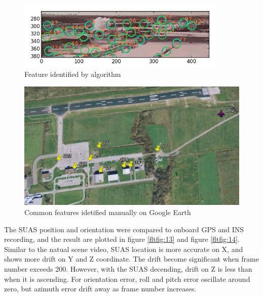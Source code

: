 \begin{figure}[h]
\centering
\includegraphics[width=10cm, keepaspectratio=true]
{./Figures/fltfig/airport/frame398_features.jpg}
\caption{Feature identified by algorithm }
\label{fltfig:11}
\end{figure}

\begin{figure}[h]
\centering
\includegraphics[width=13cm, keepaspectratio=true]
{./Figures/fltfig/airport/uav_and_identified_landmark.png}
\caption{Common features idetified manually on Google Earth }
\label{fltfig:12}
\end{figure}
\FloatBarrier

The SUAS position and orientation were compared to onboard GPS and INS
recording, and the result are plotted in figure \ref{fltfig:13} and
figure \ref{fltfig:14}. Similar to the natual scene video, SUAS
location is more accurate on X, and shows more drift on Y and Z
coordinate. The drift become significant when frame number exceeds
200. However, with the SUAS decending, drift on Z is less than when it
is ascending. For orientation error, roll and pitch error oscillate
around zero, but azimuth error drift away as frame number increases. 

